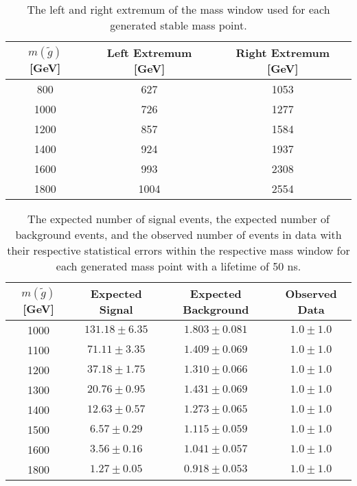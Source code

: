 \begin{table}[!htbp]
  \begin{center}
    \begin{tabular}{ccc}
        \hline
        $m(\tilde{g})$ [GeV]  & Left Extremum [GeV] & Right Extremum [GeV] \\
        \hline
        800    & 627 & 1053 \\
        1000    & 726 & 1277 \\
        1200    & 857 & 1584 \\
        1400    & 924 & 1937 \\
        1600    & 993 & 2308 \\
        1800    & 1004 & 2554 \\
        \hline
    \end{tabular}
  \end{center}
  \caption{The left and right extremum of the mass window used for each generated stable mass point.}
  \label{tab:app_window_stable}
\end{table}



\begin{table}[!htbp]
  \begin{center}
    \begin{tabular}{cccc}
      \hline
      $m(\tilde{g})$ [GeV]  & Expected Signal & Expected Background & Observed Data\\ 
      \hline
      1000    & $131.18 \pm 6.35 $ & $1.803 \pm 0.081 $ & $1.0 \pm 1.0$ \\
      1100    & $71.11 \pm 3.35 $  & $1.409 \pm 0.069 $ & $1.0 \pm 1.0$ \\
      1200    & $37.18 \pm 1.75 $  & $1.310 \pm 0.066 $ & $1.0 \pm 1.0$ \\
      1300    & $20.76 \pm 0.95 $  & $1.431 \pm 0.069 $ & $1.0 \pm 1.0$ \\
      1400    & $12.63 \pm 0.57 $  & $1.273 \pm 0.065 $ & $1.0 \pm 1.0$ \\
      1500    & $6.57 \pm 0.29 $   & $1.115 \pm 0.059 $ & $1.0 \pm 1.0$ \\
      1600    & $3.56 \pm 0.16 $   & $1.041 \pm 0.057 $ & $1.0 \pm 1.0$ \\
      1800    & $1.27 \pm 0.05 $   & $0.918 \pm 0.053 $ & $1.0 \pm 1.0$ \\
      \hline
    \end{tabular}
  \end{center}
  \caption{The expected number of signal events, the expected number of background events, and the observed number of events in data with their respective statistical errors within the respective mass window for each generated mass point with a lifetime of 50 ns.}
  \label{tab:app_counts_50ns}
\end{table}

